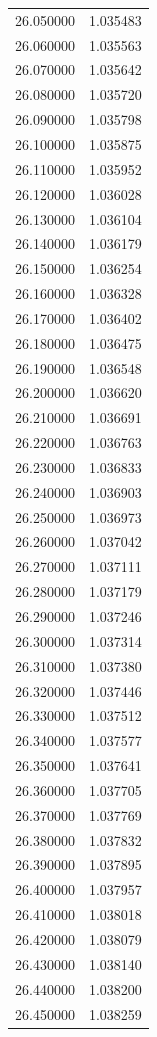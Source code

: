 \begin{tabular}{rr}
26.050000 & 1.035483 \\
26.060000 & 1.035563 \\
26.070000 & 1.035642 \\
26.080000 & 1.035720 \\
26.090000 & 1.035798 \\
26.100000 & 1.035875 \\
26.110000 & 1.035952 \\
26.120000 & 1.036028 \\
26.130000 & 1.036104 \\
26.140000 & 1.036179 \\
26.150000 & 1.036254 \\
26.160000 & 1.036328 \\
26.170000 & 1.036402 \\
26.180000 & 1.036475 \\
26.190000 & 1.036548 \\
26.200000 & 1.036620 \\
26.210000 & 1.036691 \\
26.220000 & 1.036763 \\
26.230000 & 1.036833 \\
26.240000 & 1.036903 \\
26.250000 & 1.036973 \\
26.260000 & 1.037042 \\
26.270000 & 1.037111 \\
26.280000 & 1.037179 \\
26.290000 & 1.037246 \\
26.300000 & 1.037314 \\
26.310000 & 1.037380 \\
26.320000 & 1.037446 \\
26.330000 & 1.037512 \\
26.340000 & 1.037577 \\
26.350000 & 1.037641 \\
26.360000 & 1.037705 \\
26.370000 & 1.037769 \\
26.380000 & 1.037832 \\
26.390000 & 1.037895 \\
26.400000 & 1.037957 \\
26.410000 & 1.038018 \\
26.420000 & 1.038079 \\
26.430000 & 1.038140 \\
26.440000 & 1.038200 \\
26.450000 & 1.038259 \\

\end{tabular}
